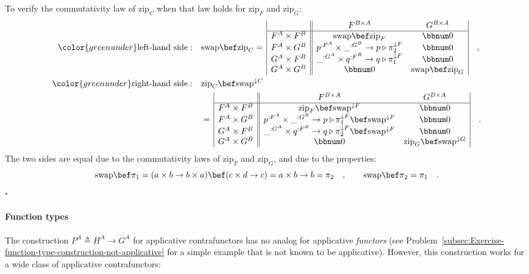 To verify the commutativity law of $\text{zip}_{C}$ when that law
holds for $\text{zip}_{F}$ and $\text{zip}_{G}$:
\begin{align*}
{\color{greenunder}\text{left-hand side}:}\quad & \text{swap}\bef\text{zip}_{C}=\,\begin{array}{|c||cc|}
 & F^{B\times A} & G^{B\times A}\\
\hline F^{A}\times F^{B} & \text{swap}\bef\text{zip}_{F} & \bbnum 0\\
F^{A}\times G^{B} & p^{:F^{A}}\times\_^{:G^{B}}\rightarrow p\triangleright\pi_{2}^{\downarrow F} & \bbnum 0\\
G^{A}\times F^{B} & \_^{:G^{A}}\times q^{:F^{B}}\rightarrow q\triangleright\pi_{1}^{\downarrow F} & \bbnum 0\\
G^{A}\times G^{B} & \bbnum 0 & \text{swap}\bef\text{zip}_{G}
\end{array}\quad,\\
{\color{greenunder}\text{right-hand side}:}\quad & \text{zip}_{C}\bef\text{swap}^{\downarrow C}\\
 & =\,\begin{array}{|c||cc|}
 & F^{B\times A} & G^{B\times A}\\
\hline F^{A}\times F^{B} & \text{zip}_{F}\bef\text{swap}^{\downarrow F} & \bbnum 0\\
F^{A}\times G^{B} & p^{:F^{A}}\times\_^{:G^{B}}\rightarrow p\triangleright\pi_{1}^{\downarrow F}\bef\text{swap}^{\downarrow F} & \bbnum 0\\
G^{A}\times F^{B} & \_^{:G^{A}}\times q^{:F^{B}}\rightarrow q\triangleright\pi_{2}^{\downarrow F}\bef\text{swap}^{\downarrow F} & \bbnum 0\\
G^{A}\times G^{B} & \bbnum 0 & \text{zip}_{G}\bef\text{swap}^{\downarrow G}
\end{array}\quad.
\end{align*}
The two sides are equal due to the commutativity laws of $\text{zip}_{F}$
and $\text{zip}_{G}$, and due to the properties:
\[
\text{swap}\bef\pi_{1}=(a\times b\rightarrow b\times a)\bef(c\times d\rightarrow c)=a\times b\rightarrow b=\pi_{2}\quad,\quad\quad\text{swap}\bef\pi_{2}=\pi_{1}\quad.
\]
$\square$

\paragraph{Function types}

The construction $P^{A}\triangleq H^{A}\rightarrow G^{A}$ for applicative
contrafunctors has no analog for applicative \emph{functors} (see
Problem~\ref{subsec:Exercise-function-type-construction-not-applicative}
for a simple example that is not known to be applicative). However,
this construction works for a wide class of applicative contrafunctors:

